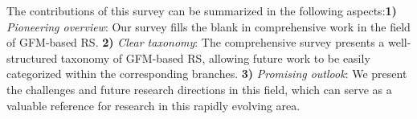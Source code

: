 The contributions of this survey can be summarized in the following aspects:\textbf{1)} \textit{Pioneering overview}: Our survey fills the blank in comprehensive work in the field of GFM-based RS. \textbf{2)} \textit{Clear taxonomy}: The comprehensive survey presents a well-structured taxonomy of GFM-based RS, allowing future work to be easily categorized within the corresponding branches. \textbf{3)} \textit{Promising outlook}: We present the challenges and future research directions in this field, which can serve as a valuable reference for research in this rapidly evolving area.



